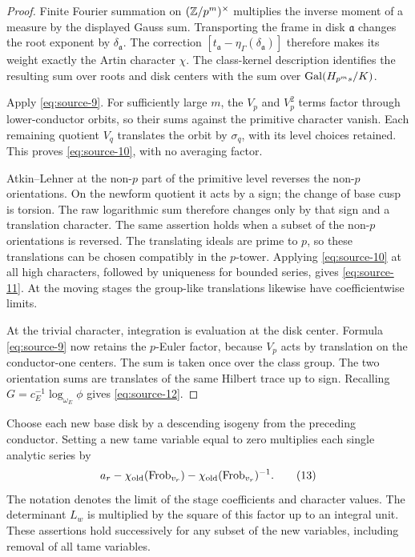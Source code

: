 \begin{proof}
Finite Fourier summation on \((\mathbb Z/p^m)^\times\) multiplies the inverse
moment of a measure by the displayed Gauss sum.  Transporting the
frame in disk \(\mathfrak a\) changes the root exponent by
\(\delta_{\mathfrak a}\).  The correction
\([t_{\mathfrak a}-\eta_\Gamma(\delta_{\mathfrak a})]\) therefore makes its
weight exactly the Artin character \(\chi\).
The class-kernel description identifies the resulting sum over roots
and disk centers with the sum over \(\operatorname{Gal}(H_{p^ms}/K)\).

Apply \eqref{eq:source-9}.  For sufficiently large \(m\), the \(V_p\)
and \(V_p^2\) terms factor through lower-conductor orbits, so their
sums against the primitive character vanish.  Each remaining
quotient \(V_q\) translates the orbit by \(\sigma_q\), with its level
choices retained.  This proves \eqref{eq:source-10}, with no averaging
factor.

Atkin--Lehner at the non-\(p\) part of the primitive level reverses
the non-\(p\) orientations.  On the newform quotient it acts by a
sign; the change of base cusp is torsion.  The raw logarithmic sum
therefore changes only by that sign and a translation character.
The same assertion holds when a subset of the non-\(p\) orientations
is reversed.  The translating ideals are prime to \(p\), so these
translations can be chosen compatibly in the \(p\)-tower.  Applying
\eqref{eq:source-10} at all high characters, followed by uniqueness
for bounded series, gives \eqref{eq:source-11}.  At the moving stages
the group-like translations likewise have coefficientwise limits.

At the trivial character, integration is evaluation at the disk
center.  Formula \eqref{eq:source-9} now retains the \(p\)-Euler
factor, because \(V_p\) acts by translation on the conductor-one
centers.  The sum is taken once over the class group.  The two
orientation sums are translates of the same Hilbert trace up to
sign.  Recalling \(G=c_E^{-1}\log_{\omega_E}\phi\) gives
\eqref{eq:source-12}.
\end{proof}

\begin{lemma}\label{pair:trace}
Choose each new base disk by a descending isogeny from the preceding
conductor.  Setting a new tame variable equal to zero multiplies
each single analytic series by
\begin{equation}
 a_r-\chi_{\rm old}(\operatorname{Frob}_{v_r})
           -\chi_{\rm old}(\operatorname{Frob}_{v_r})^{-1}.
 \tag{13}\label{eq:source-13}
\end{equation}
The notation denotes the limit of the stage coefficients and
character values.  The determinant \(L_w\) is multiplied by the
square of this factor up to an integral unit.  These assertions hold
successively for any subset of the new variables, including removal
of all tame variables.
\end{lemma}

